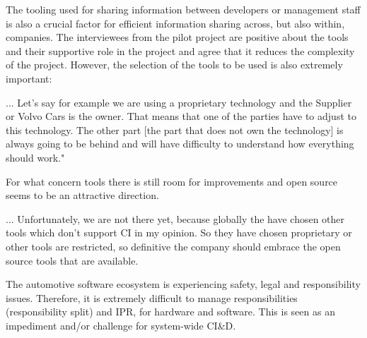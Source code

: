  The tooling used for sharing information between developers or management staff is also a crucial factor for efficient information sharing across, but also within, companies. The interviewees from the pilot project are positive about the tools and their supportive role in the project and agree that it reduces the complexity of the project. However, the selection of the tools to be used is also extremely important:

\begin{aquote}{...}
Let's say for example we are using a proprietary technology and the Supplier or Volvo Cars is the owner. That means that one of the parties have to adjust to this technology. The other part [the part that does not own the technology] is always going to be behind and will have difficulty to understand how everything should work."
\end{aquote} 

For what concern tools there is still room for improvements and open source seems to be an attractive direction.

\begin{aquote}{...}
Unfortunately, we are not there yet, because globally the have chosen other tools which don't support CI in my opinion. So they have chosen proprietary or other tools are restricted, so definitive the company should embrace the open source tools that are available.
\end{aquote}


%
%
%
%

 The automotive software ecosystem is experiencing safety, legal and responsibility issues. Therefore, it is extremely difficult to manage responsibilities (responsibility split) and IPR, for hardware and software. This is seen as an impediment and/or challenge for system-wide CI\&D.

